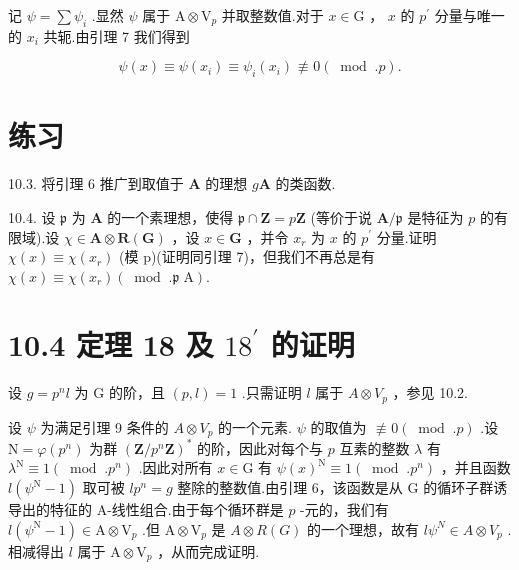 \documentclass[10pt]{article}
\begin{document}
记 \(\psi  = \sum {\psi }_{i}\) .显然 \(\psi\) 属于 \(\mathrm{A} \otimes  {\mathrm{V}}_{p}\) 并取整数值.对于 \(x \in  \mathrm{G}\) ， \(x\) 的 \({p}^{\prime }\) 分量与唯一的 \({x}_{i}\) 共轭.由引理 7 我们得到

\[
\psi \left( x\right)  \equiv  \psi \left( {x}_{i}\right)  \equiv  {\psi }_{i}\left( {x}_{i}\right)  \text{ ≢ } 0\left( {\;\operatorname{mod}\;.p}\right) .
\]

\section*{练习}

10.3. 将引理 6 推广到取值于 \(\mathbf{A}\) 的理想 \(g\mathbf{A}\) 的类函数.

10.4. 设 \(\mathfrak{p}\) 为 \(\mathbf{A}\) 的一个素理想，使得 \(\mathfrak{p} \cap  \mathbf{Z} = p\mathbf{Z}\) (等价于说 \(\mathbf{A}/\mathfrak{p}\) 是特征为 \(p\) 的有限域).设 \(\chi  \in  \mathbf{A} \otimes  \mathbf{R}\left( \mathbf{G}\right)\) ，设 \(x \in  \mathbf{G}\) ，并令 \({x}_{r}\) 为 \(x\) 的 \({p}^{\prime }\) 分量.证明 \(\chi \left( x\right)  \equiv  \chi \left( {x}_{r}\right)\) (模 p)(证明同引理 7)，但我们不再总是有 \(\chi \left( x\right)  \equiv  \chi \left( {x}_{r}\right) \left( {{\;\operatorname{mod}\;.}\mathfrak{p}\mathrm{\;A}}\right) .\)

\section*{10.4 定理 18 及 \({18}^{\prime }\) 的证明}

设 \(g = {p}^{n}l\) 为 \(\mathrm{G}\) 的阶，且 \(\left( {p,l}\right)  = 1\) .只需证明 \(l\) 属于 \(A \otimes  {V}_{p}\) ，参见 10.2.

设 \(\psi\) 为满足引理 9 条件的 \(A \otimes  {V}_{p}\) 的一个元素. \(\psi\) 的取值为 \(\text{ ≢ } 0\left( {{\;\operatorname{mod}\;.}p}\right)\) .设 \(\mathrm{N} = \varphi \left( {p}^{n}\right)\) 为群 \({\left( \mathbf{Z}/{p}^{n}\mathbf{Z}\right) }^{ * }\) 的阶，因此对每个与 \(p\) 互素的整数 \(\lambda\) 有 \({\lambda }^{\mathrm{N}} \equiv  1\left( {{\;\operatorname{mod}\;.}{p}^{n}}\right)\) .因此对所有 \(x \in  \mathrm{G}\) 有 \(\psi {\left( x\right) }^{\mathrm{N}} \equiv  1\left( {{\;\operatorname{mod}\;.}{p}^{n}}\right)\) ，并且函数 \(l\left( {{\psi }^{\mathrm{N}} - 1}\right)\) 取可被 \(l{p}^{n} = g\) 整除的整数值.由引理 6，该函数是从 G 的循环子群诱导出的特征的 A-线性组合.由于每个循环群是 \(p\) -元的，我们有 \(l\left( {{\psi }^{\mathrm{N}} - 1}\right)  \in  \mathrm{A} \otimes  {\mathrm{V}}_{p}\) .但 \(\mathrm{A} \otimes  {\mathrm{V}}_{p}\) 是 \(A \otimes  R\left( G\right)\) 的一个理想，故有 \(l{\psi }^{N} \in  A \otimes  {V}_{p}\) .相减得出 \(l\) 属于 \(\mathrm{A} \otimes  {\mathrm{V}}_{p}\) ，从而完成证明.
\end{document}
